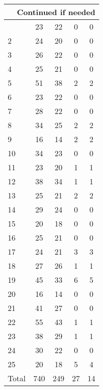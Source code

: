 \begin{center}
\begin{longtable}{l|c|c|c|c}
\hline \multicolumn{5}{|r|}{{Continued if needed}} \\ \hline
\endfoot 
1 & 23 & 22 & 0 & 0\\ \hline
2 & 24 & 20 & 0 & 0\\ \hline
3 & 26 & 22 & 0 & 0\\ \hline
4 & 25 & 21 & 0 & 0\\ \hline
5 & 51 & 38 & 2 & 2\\ \hline
6 & 23 & 22 & 0 & 0\\ \hline
7 & 28 & 22 & 0 & 0\\ \hline
8 & 34 & 25 & 2 & 2\\ \hline
9 & 16 & 14 & 2 & 2\\ \hline
10 & 34 & 23 & 0 & 0\\ \hline
11 & 23 & 20 & 1 & 1\\ \hline
12 & 38 & 34 & 1 & 1\\ \hline
13 & 25 & 21 & 2 & 2\\ \hline
14 & 29 & 24 & 0 & 0\\ \hline
15 & 20 & 18 & 0 & 0\\ \hline
16 & 25 & 21 & 0 & 0\\ \hline
17 & 24 & 21 & 3 & 3\\ \hline
18 & 27 & 26 & 1 & 1\\ \hline
19 & 45 & 33 & 6 & 5\\ \hline
20 & 16 & 14 & 0 & 0\\ \hline
21 & 41 & 27 & 0 & 0\\ \hline
22 & 55 & 43 & 1 & 1\\ \hline
23 & 38 & 29 & 1 & 1\\ \hline
24 & 30 & 22 & 0 & 0\\ \hline
25 & 20 & 18 & 5 & 4\\ \hline
\hline \hline
Total & 740 & 249 & 27 & 14



\end{longtable}
\end{center}

 
